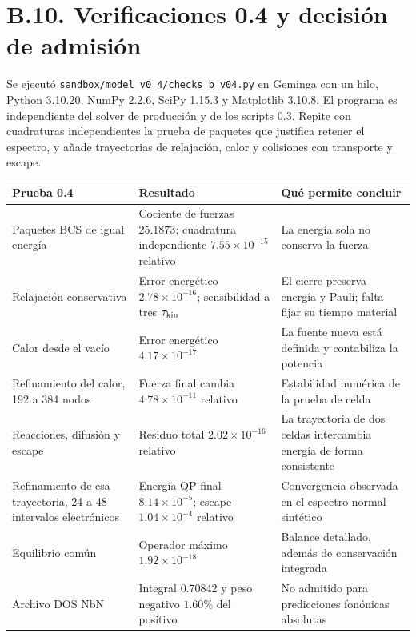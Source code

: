 \documentclass[
  spanish,
  10pt,
  a4paper,
]{article}
\newcounter{none} %
\begin{document}
\section{B.10. Verificaciones 0.4 y decisión de
admisión}\label{b.10.-verificaciones-0.4-y-decisiuxf3n-de-admisiuxf3n}

Se ejecutó \nolinkurl{sandbox/model_v0_4/checks_b_v04.py} en Geminga
con un hilo, Python 3.10.20, NumPy 2.2.6, SciPy 1.15.3 y Matplotlib
3.10.8. El programa es independiente del solver de producción y de los
scripts 0.3. Repite con cuadraturas independientes la prueba de paquetes
que justifica retener el espectro, y añade trayectorias de relajación,
calor y colisiones con transporte y escape.

{\def\LTcaptype{none} %
\begin{longtable}[]{@{}
  >{\raggedright\arraybackslash}p{}
  >{\raggedright\arraybackslash}p{}
  >{\raggedright\arraybackslash}p{}@{}}
\toprule\noalign{}
\begin{minipage}[b]{\linewidth}\raggedright
Prueba 0.4
\end{minipage} & \begin{minipage}[b]{\linewidth}\raggedright
Resultado
\end{minipage} & \begin{minipage}[b]{\linewidth}\raggedright
Qué permite concluir
\end{minipage} \\
\midrule\noalign{}
\endhead
\bottomrule\noalign{}
\endlastfoot
Paquetes BCS de igual energía & Cociente de fuerzas \(25.1873\);
cuadratura independiente \(7.55\times10^{-15}\) relativo & La energía
sola no conserva la fuerza \\
Relajación conservativa & Error energético \(2.78\times10^{-16}\);
sensibilidad a tres \(\tau_{\rm kin}\) & El cierre preserva energía y
Pauli; falta fijar su tiempo material \\
Calor desde el vacío & Error energético \(4.17\times10^{-17}\) & La
fuente nueva está definida y contabiliza la potencia \\
Refinamiento del calor, 192 a 384 nodos & Fuerza final cambia
\(4.78\times10^{-11}\) relativo & Estabilidad numérica de la prueba de
celda \\
Reacciones, difusión y escape & Residuo total \(2.02\times10^{-16}\)
relativo & La trayectoria de dos celdas intercambia energía de forma
consistente \\
Refinamiento de esa trayectoria, 24 a 48 intervalos electrónicos &
Energía QP final \(8.14\times10^{-5}\); escape \(1.04\times10^{-4}\)
relativo & Convergencia observada en el espectro normal sintético \\
Equilibrio común & Operador máximo \(1.92\times10^{-18}\) & Balance
detallado, además de conservación integrada \\
Archivo DOS NbN & Integral \(0.70842\) y peso negativo \(1.60\%\) del
positivo & No admitido para predicciones fonónicas absolutas \\
\end{longtable}
}
\end{document}
